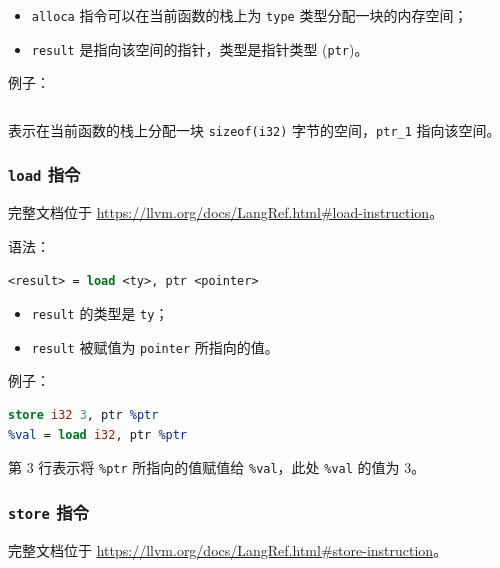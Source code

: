 \begin{itemize}
  \item \texttt{alloca} 指令可以在当前函数的栈上为 \texttt{type} 类型分配一块的内存空间；
  \item \texttt{result} 是指向该空间的指针，类型是指针类型 (\texttt{ptr})。
\end{itemize}

例子：
\begin{lstlisting}[language=llvm]
%ptr_1 = alloca i32
\end{lstlisting}
表示在当前函数的栈上分配一块 \texttt{sizeof(i32)} 字节的空间，\texttt{ptr\_1} 指向该空间。

\subsubsection{\texttt{load} 指令}\label{LLVM-load-instructions}

\begin{remark}
完整文档位于 \url{https://llvm.org/docs/LangRef.html\#load-instruction}。
\end{remark}

语法：
\begin{lstlisting}[language=llvm]
<result> = load <ty>, ptr <pointer>
\end{lstlisting}

\begin{itemize}
  \item \texttt{result} 的类型是 \texttt{ty}；
  \item \texttt{result} 被赋值为 \texttt{pointer} 所指向的值。
\end{itemize}

例子：
\begin{lstlisting}[language=llvm]
%ptr = alloca i32
store i32 3, ptr %ptr
%val = load i32, ptr %ptr
\end{lstlisting}

第 3 行表示将 \texttt{\%ptr} 所指向的值赋值给 \texttt{\%val}，此处 \texttt{\%val}
的值为 3。

\subsubsection{\texttt{store} 指令}\label{LLVM-store-instructions}

\begin{remark}
完整文档位于 \url{https://llvm.org/docs/LangRef.html\#store-instruction}。
\end{remark}

